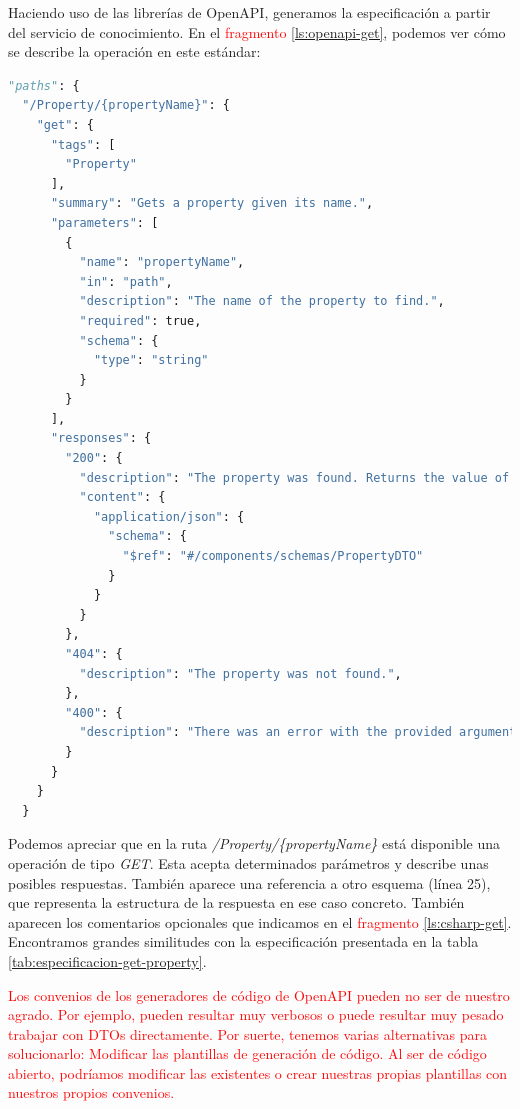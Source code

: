 Haciendo uso de las librerías de OpenAPI, generamos la especificación a partir del servicio de conocimiento. En el \textcolor{red}{fragmento} \ref{ls:openapi-get}, podemos ver cómo se describe la operación en este estándar:

\begin{lstlisting}[language=python,caption={Especificación OpenAPI del método para obtener una propiedad del conocimiento (\lstinline{GetProperty}).},captionpos=b, label=ls:openapi-get]
"paths": {
  "/Property/{propertyName}": {
    "get": {
      "tags": [
        "Property"
      ],
      "summary": "Gets a property given its name.",
      "parameters": [
        {
          "name": "propertyName",
          "in": "path",
          "description": "The name of the property to find.",
          "required": true,
          "schema": {
            "type": "string"
          }
        }
      ],
      "responses": {
        "200": {
          "description": "The property was found. Returns the value of the property.",
          "content": {
            "application/json": {
              "schema": {
                "$ref": "#/components/schemas/PropertyDTO"
              }
            }
          }
        },
        "404": {
          "description": "The property was not found.",
        },
        "400": {
          "description": "There was an error with the provided arguments.",
        }
      }
    }
  }
\end{lstlisting}

Podemos apreciar que en la ruta \emph{/Property/\{propertyName\}} está disponible una operación de tipo \emph{GET}. Esta acepta determinados parámetros y describe unas posibles respuestas. También aparece una referencia a otro esquema (línea 25), que representa la estructura de la respuesta en ese caso concreto. También aparecen los comentarios opcionales que indicamos en el \textcolor{red}{fragmento} \ref{ls:csharp-get}. Encontramos grandes similitudes con la especificación presentada en la tabla \ref{tab:especificacion-get-property}.

\textcolor{red}{Los convenios de los generadores de código de OpenAPI pueden no ser de nuestro agrado. Por ejemplo, pueden resultar muy verbosos o puede resultar muy pesado trabajar con DTOs directamente. Por suerte, tenemos varias alternativas para solucionarlo: Modificar las plantillas de generación de código. Al ser de código abierto, podríamos modificar las existentes o crear nuestras propias plantillas con nuestros propios convenios.}

